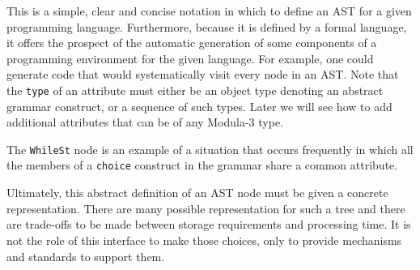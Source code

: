 {{\medskip\noindent%
This is a simple, clear and concise notation in which to define an AST
for a given programming language. Furthermore, because it is defined
by a formal language, it offers the prospect of the automatic
generation of some components of a programming environment for the
given language. For example, one could generate code that would
systematically visit every node in an AST. Note that the {\tt type} of an
attribute must either be an object type denoting an abstract grammar
construct, or a sequence of such types. Later we will see how to add
additional attributes that can be of any Modula-3 type.
\par
The {\tt WhileSt} node is an example of a situation that occurs frequently
in which all the members of a {\tt choice} construct in the grammar
share a common attribute. 
\par
Ultimately, this abstract definition of an AST node must be given a
concrete representation. There are many possible representation for
such a tree and there are trade-offs to be made between storage
requirements and processing time. It is not the role of this interface
to make those choices, only to provide mechanisms and standards to
support them.
\par
}}
